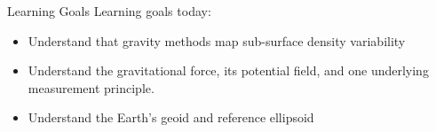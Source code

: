   \begin{frame}
    \begin{PointSix}{Learning Goals}
      \small
      \alert{Learning goals today:}
      \begin{itemize}
        \item Understand that gravity methods map sub-surface density variability
        \item Understand the gravitational force, its potential field, and one underlying measurement principle.
        \item Understand the Earth's geoid and reference ellipsoid
      \end{itemize}
    \end{PointSix}
    \end{frame}